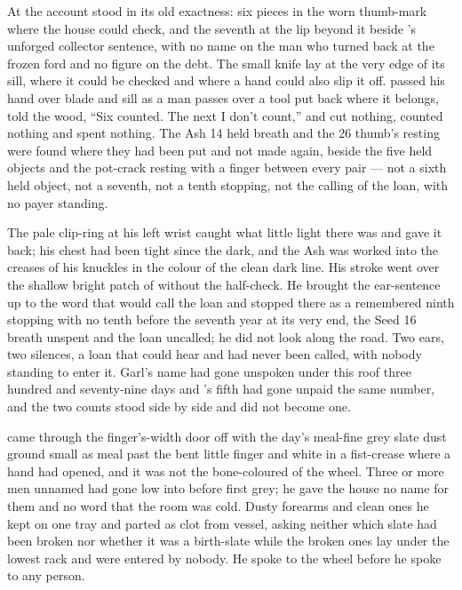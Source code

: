 \scenebreak

At  the account stood in its old exactness: six pieces in the worn thumb-mark where the house could check, and the seventh at the lip beyond it beside 's unforged collector sentence, with no name on the man who turned back at the frozen ford and no figure on the debt. The small knife lay at the very edge of its sill, where it could be checked and where a hand could also slip it off.  passed his hand over blade and sill as a man passes over a tool put back where it belongs, told the wood, “Six counted. The next I don't count,” and cut nothing, counted nothing and spent nothing. The Ash 14 held breath and the  26 thumb's resting were found where they had been put and not made again, beside the five held objects and the pot-crack resting with a finger between every pair — not a sixth held object, not a seventh, not a tenth stopping, not the calling of the loan, with no payer standing.

The pale clip-ring at his left wrist caught what little light there was and gave it back; his chest had been tight since the dark, and the Ash was worked into the creases of his knuckles in the colour of the clean dark line. His stroke went over the shallow bright patch of  without the half-check. He brought the ear-sentence up to the word that would call the loan and stopped there as a remembered ninth stopping with no tenth before the seventh year at its very end, the Seed 16 breath unspent and the loan uncalled; he did not look along the road. Two ears, two silences, a loan that could hear and had never been called, with nobody standing to enter it. Garl's name had gone unspoken under this roof three hundred and seventy-nine days and 's fifth had gone unpaid the same number, and the two counts stood side by side and did not become one.

 came through the finger's-width door off  with the day's meal-fine grey slate dust ground small as meal past the bent little finger and white in a fist-crease where a hand had opened, and it was not the bone-coloured  of the wheel. Three or more men unnamed had gone low into  before first grey; he gave the house no name for them and no word that the room was cold. Dusty forearms and clean ones he kept on one tray and parted as clot from vessel, asking neither which slate had been broken nor whether it was a birth-slate while the broken ones lay under the lowest rack and were entered by nobody. He spoke to the wheel before he spoke to any person.


